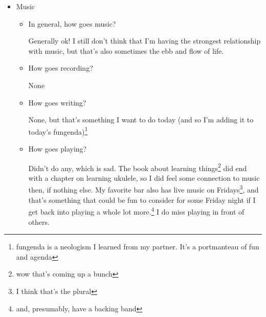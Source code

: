 \documentclass[12pt]{article}
\renewcommand{\,}{\textsuperscript{,}}
\begin{document}
\begin{itemize}
\begin{itemize}
\begin{itemize}
\item How goes writing poetry again?

Generally decently.  
As we saw in \href{reflection-june-2026}{yesterday's post,} I am able to write an (admittedly bad) poem in the form I want relatively quickly.  
That's the end of what I did, though, so that's not the ideal for me, especially long term.  
I think maybe getting back into a sonnet a night could be nice?

\item We're counting audio book here, anything good?

Still finishing Bedlam Bride, 42 minutes and 47 seconds left.  
OH, I should reflect about listening to audiobooks at single speed.  
Added to the list.

\item Upon reflection, how's the written word? Anything missing in the four\footnote{fixed today} questions?

Generally decent! I think that I'd like to get back into reading about writing again.  
I should add a line about the web serial again. That's something that I want to return to, so having a daily reminder.  
No updates there, so adding that to the list for tomorrow's reflection.\footnote{look at me, optimistically assuming I'll be blogging tomorrow}

\end{itemize}

\item Music

\begin{itemize}

\item In general, how goes music?

Generally ok! I still don't think that I'm having the strongest relationship with music, but that's also sometimes the ebb and flow of life.

\item How goes recording?

None

\item How goes writing?

None, but that's something I want to do today (and so I'm adding it to today's fungenda)\footnote{fungenda is a neologism I learned from my partner. It's a portmanteau of fun and agenda}

\item How goes playing?

Didn't do any, which is sad.  
The book about learning things\footnote{wow that's coming up a bunch} did end with a chapter on learning ukulele, so I did feel some connection to music then, if nothing else.  
My favorite bar also has live music on Fridays\footnote{I think that's the plural}, and that's something that could be fun to consider for some Friday night if I get back into playing a whole lot more.\footnote{and, presumably, have a backing band}  
I do miss playing in front of others.


\end{itemize}
\end{itemize}
\end{itemize}
\end{document}
